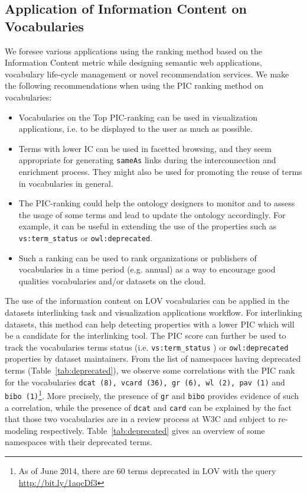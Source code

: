 \subsection{Application of Information Content on Vocabularies}
\label{sec:application}
We foresee various applications using the ranking method based on the Information Content metric while designing semantic web applications, vocabulary life-cycle management or novel recommendation services. We make the following recommendations when using the PIC ranking method on vocabularies:
\begin{itemize}
 \item Vocabularies on the Top PIC-ranking can be used in visualization applications, i.e. to be displayed to the user as much as possible.
 \item Terms with lower IC can be used in facetted browsing, and they seem appropriate for generating \texttt{sameAs} links during the interconnection and enrichment process. They might also be used for promoting the reuse of terms in vocabularies in general.
 \item The PIC-ranking could help the ontology designers to monitor and to assess the usage of some terms and lead to update the ontology accordingly. For example, it can be useful in extending the use of the properties such as \texttt{vs:term\_status} or \texttt{owl:deprecated}.
 \item Such a ranking can be used to rank organizations or publishers of vocabularies in a time period (e.g. annual) as a way to encourage good qualities vocabularies and/or datasets on the cloud.
\end{itemize}
The use of the information content on LOV vocabularies can be applied in the datasets interlinking task and visualization applications workflow. For interlinking datasets, this method can help detecting properties with a lower PIC which will be a candidate for the interlinking tool. The PIC score can further be used to track the vocabularies terms status (i.e. \texttt{vs:term\_status} ) or \texttt{owl:deprecated} properties by dataset maintainers. From the list of namespaces having deprecated terms (Table~\ref{tab:deprecated}), we observe some correlations with the PIC rank for the vocabularies \texttt{dcat (8), vcard (36), gr (6), wl (2), pav (1)} and \texttt{bibo (1)}\footnote{As of June 2014, there are 60 terms deprecated in LOV with the query \url{http://bit.ly/1aqcDf3}}. More precisely, the presence of \texttt{gr} and \texttt{bibo} provides evidence of such a correlation, while the presence of \texttt{dcat} and \texttt{card} can be explained by the fact that those two vocabularies are in a review process at W3C and subject to re-modeling respectively. Table~\ref{tab:deprecated} gives an overview of some namespaces with their deprecated terms.



